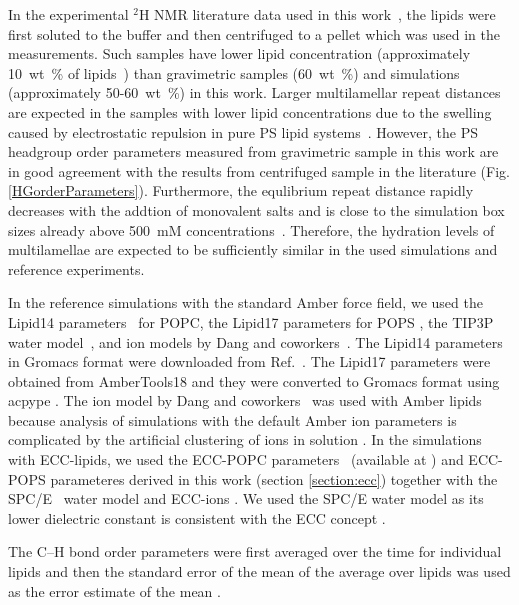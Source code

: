 \documentclass[journal=jpcbfk,manuscript=article]{achemso}
\begin{document}
In the experimental $^2$H NMR literature data used in this work~\cite{browning80,roux90},
the lipids were first soluted to the buffer and then centrifuged to a pellet which
was used in the measurements. Such samples have lower lipid concentration
(approximately 10~wt~\% of lipids~\cite{browning80,roux88,roux90}) than 
gravimetric samples (60~wt~\%) and simulations (approximately 50-60~wt~\%) in this work.
Larger multilamellar repeat distances are expected in the samples with lower lipid
concentrations due to the swelling caused by electrostatic repulsion in pure PS lipid systems~\cite{millman82}.
However, the PS headgroup order parameters measured from gravimetric sample in this work
are in good agreement with the results from centrifuged sample in the literature \cite{browning80} (Fig. \ref{HGorderParameters}).
Furthermore, the equlibrium repeat distance rapidly decreases with the addtion of monovalent
salts and is close to the simulation box sizes already above 500~mM concentrations~\cite{millman82,rand89}.
Therefore, the hydration levels of multilamellae are expected to be sufficiently similar
in the used simulations and reference experiments.


In the reference simulations with the standard Amber force field,
we used the Lipid14 parameters~\cite{dickson14} for POPC, the Lipid17 parameters for POPS \cite{lipid17-future},
the TIP3P water model~\cite{jorgensen83}, and ion models by Dang and coworkers~\cite{smith94,chang1999,dang2006}.
The Lipid14 parameters in Gromacs format were downloaded from Ref.~. 
The Lipid17 parameters were obtained from AmberTools18 \cite{amber18} 
and they were converted to Gromacs format using acpype \cite{acpype}.  
The ion model by Dang and coworkers~\cite{smith94,chang1999,dang2006} was used with Amber lipids because
analysis of simulations with the default Amber ion parameters is complicated by the artificial
clustering of ions in solution \cite{nmrlipids_proj4}.
In the simulations with ECC-lipids,
we used the ECC-POPC parameters~\cite{melcr18} (available at \cite{ECC-POPC_nacl_cacl2_files}) and 
ECC-POPS parameteres derived in this work (section \ref{section:ecc}) 
together with the SPC/E~\cite{Berendsen1987} water model and 
ECC-ions \cite{martinek17, kohagen16, Pluharova2014}.
We used the SPC/E water model as its lower dielectric constant is consistent with the
ECC concept \cite{leontyev11,leontyev14}.

The C--H bond order parameters were first averaged over the time for individual lipids and
then the standard error of the mean of the average over lipids was used as the error estimate
of the mean \cite{botan15,ollila16,nmrlipids_proj4}.
\end{document}
